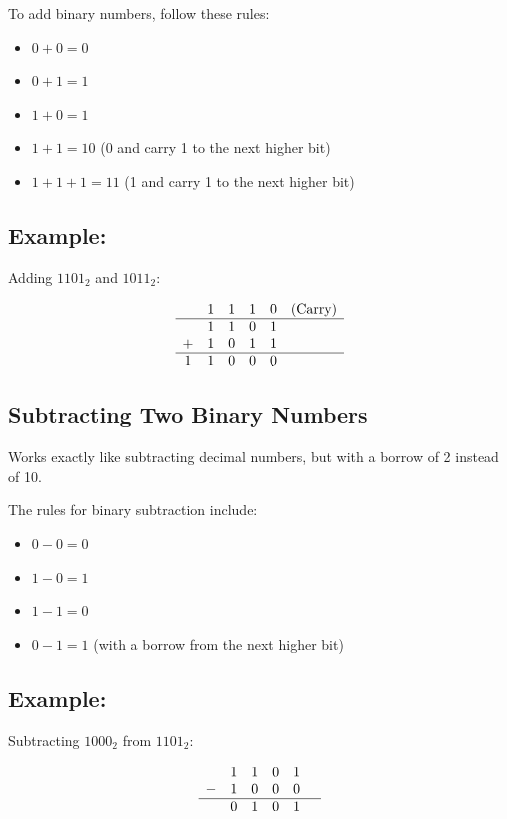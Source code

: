 \documentclass[12pt,openany]{book}
\begin{document}
	To add binary numbers, follow these rules:
	\begin{itemize}
		\item[] \(0 + 0 = 0\)
		\item[] \(0 + 1 = 1\)
		\item[] \(1 + 0 = 1\)
		\item[] \(1 + 1 = 10\) (0 and carry 1 to the next higher bit)
		\item[] \(1 + 1 + 1 = 11\) (1 and carry 1 to the next higher bit)
	\end{itemize}
	
	\subsection*{Example:}
	
	Adding \(1101_2\) and \(1011_2\):
	
	\[
		\begin{array}{cccccc}
			  & 1 & 1 & 1 & 0 & \text{(Carry)} \\
			\hline
			  & 1 & 1 & 0 & 1 &                \\
			+ & 1 & 0 & 1 & 1 &                \\
			\hline
			1 & 1 & 0 & 0 & 0 &                \\
		\end{array}
	\]
	
	
	\newpage
	\subsection{Subtracting Two Binary Numbers}
	Works exactly like subtracting decimal numbers, but with a borrow of 2 instead of 10.
	
	The rules for binary subtraction include:
	\begin{itemize}
		\item[] \(0 - 0 = 0\)
		\item[] \(1 - 0 = 1\)
		\item[] \(1 - 1 = 0\)
		\item[] \(0 - 1 = 1\) (with a borrow from the next higher bit)
	\end{itemize}
	
	\subsection*{Example:}
	
	Subtracting \(1000_2\) from \(1101_2\):
	
	\[
		\begin{array}{cccccc}
			  & 1 & 1 & 0 & 1 &   \\
			- & 1 & 0 & 0 & 0 &   \\
			\hline
			  & 0 & 1 & 0 & 1 &   \\
		\end{array}
	\]
	
\end{document}

